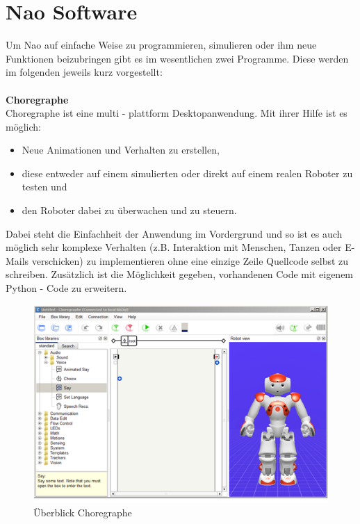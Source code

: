 \section{Nao Software}
Um Nao auf einfache Weise zu programmieren, simulieren oder ihm neue Funktionen beizubringen gibt es im wesentlichen zwei Programme. Diese werden im folgenden jeweils kurz vorgestellt:
\\
\\
\noindent
\textbf{Choregraphe} 
\\
Choregraphe ist eine multi - plattform Desktopanwendung. Mit ihrer Hilfe ist es möglich:
\begin{itemize}
\item Neue Animationen und Verhalten zu erstellen,
\item diese entweder auf einem simulierten  oder direkt auf einem realen Roboter zu testen und
\item den Roboter dabei zu überwachen und zu steuern.
\end{itemize}
Dabei steht die Einfachheit der Anwendung im Vordergrund und so ist es auch möglich sehr komplexe Verhalten (z.B. Interaktion mit Menschen, Tanzen oder E-Mails verschicken) zu implementieren ohne eine einzige Zeile Quellcode selbst zu schreiben. Zusätzlich ist die Möglichkeit gegeben, vorhandenen Code mit eigenem Python - Code zu erweitern.

\begin{figure}[H]						
	\centering							
	\includegraphics[scale=1.0]{Bilder/choregraphe.png}			
	\caption{Überblick Choregraphe}						
	\label{f:nao_choregraphe}						
\end{figure}

